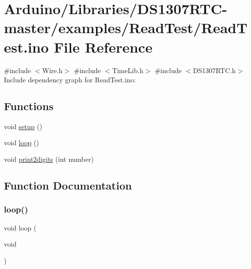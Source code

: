 \hypertarget{_read_test_8ino}{}\section{Arduino/\+Libraries/\+D\+S1307\+R\+T\+C-\/master/examples/\+Read\+Test/\+Read\+Test.ino File Reference}
\label{_read_test_8ino}
{\ttfamily \#include $<$Wire.\+h$>$}\newline
{\ttfamily \#include $<$Time\+Lib.\+h$>$}\newline
{\ttfamily \#include $<$D\+S1307\+R\+T\+C.\+h$>$}\newline
Include dependency graph for Read\+Test.\+ino\+:
\subsection*{Functions}
\begin{DoxyCompactItemize}
\item 
void \hyperlink{_read_test_8ino_a4fc01d736fe50cf5b977f755b675f11d}{setup} ()
\item 
void \hyperlink{_read_test_8ino_afe461d27b9c48d5921c00d521181f12f}{loop} ()
\item 
void \hyperlink{_read_test_8ino_aad1f7fa230835947462ccb2a00040531}{print2digits} (int number)
\end{DoxyCompactItemize}


\subsection{Function Documentation}
\mbox{\label{_read_test_8ino_afe461d27b9c48d5921c00d521181f12f}} 
\subsubsection{\texorpdfstring{loop()}{loop()}}
{\footnotesize\ttfamily void loop (\begin{DoxyParamCaption}\item[{void}]{ }\end{DoxyParamCaption})}

\mbox{\label{_read_test_8ino_aad1f7fa230835947462ccb2a00040531}} 
